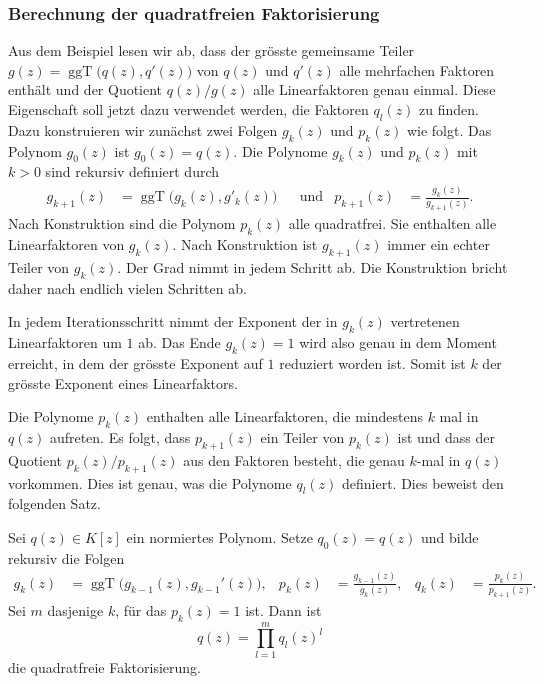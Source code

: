 \subsubsection{Berechnung der quadratfreien Faktorisierung}
Aus dem Beispiel lesen wir ab, dass der grösste gemeinsame
Teiler $g(z)=\operatorname{ggT}\bigl(q(z),q'(z)\bigr)$ von $q(z)$
und $q'(z)$ alle mehrfachen Faktoren enthält und der Quotient
$q(z)/g(z)$ alle Linearfaktoren genau einmal.
Diese Eigenschaft soll jetzt dazu verwendet werden, die Faktoren
$q_l(z)$ zu finden.
Dazu konstruieren wir zunächst zwei Folgen $g_k(z)$ und $p_k(z)$
wie folgt.
Das Polynom $g_0(z)$ ist $g_0(z)=q(z)$.
Die Polynome $g_k(z)$ und $p_k(z)$ mit $k>0$ sind rekursiv definiert
durch
\begin{align*}
g_{k+1}(z) &= \operatorname{ggT}\bigl(g_k(z),g'_k(z)\bigr)
&&\text{und}&
p_{k+1}(z) &= \frac{g_k(z)}{g_{k+1}(z)}.
\end{align*}
Nach Konstruktion sind die Polynom $p_k(z)$ alle quadratfrei.
Sie enthalten alle Linearfaktoren von $g_k(z)$.
Nach Konstruktion ist $g_{k+1}(z)$ immer ein echter Teiler von $g_k(z)$.
Der Grad nimmt in jedem Schritt ab.
Die Konstruktion bricht daher nach endlich vielen Schritten ab.

In jedem Iterationsschritt nimmt der Exponent der in $g_k(z)$
vertretenen Linearfaktoren um $1$ ab.
Das Ende $g_k(z)=1$ wird also genau in dem Moment erreicht, 
in dem der grösste Exponent auf $1$ reduziert worden ist.
Somit ist $k$ der grösste Exponent eines Linearfaktors.

Die Polynome $p_k(z)$ enthalten alle Linearfaktoren, die
mindestens $k$ mal in $q(z)$ aufreten.
Es folgt, dass $p_{k+1}(z)$ ein Teiler von $p_k(z)$ ist und dass
der Quotient $p_k(z)/p_{k+1}(z)$ aus den Faktoren besteht, die 
genau $k$-mal in $q(z)$ vorkommen.
Dies ist genau, was die Polynome $q_l(z)$ definiert.
Dies beweist den folgenden Satz.

\begin{satz}
%
Sei $q(z)\in K[z]$ ein normiertes Polynom.
Setze $q_0(z)=q(z)$ und bilde rekursiv die Folgen
\begin{align*}
g_k(z) &= \operatorname{ggT}\bigl(g_{k-1}(z),g_{k-1}'(z)\bigr),
&
p_k(z) &= \frac{g_{k-1}(z)}{g_k(z)},
&
q_k(z) &= \frac{p_k(z)}{p_{k+1}(z)}.
\end{align*}
Sei $m$ dasjenige $k$, für das $p_k(z)=1$ ist.
Dann ist
\[
q(z)
=
\prod_{l=1}^m q_l(z)^l
\]
die quadratfreie Faktorisierung.
\end{satz}

